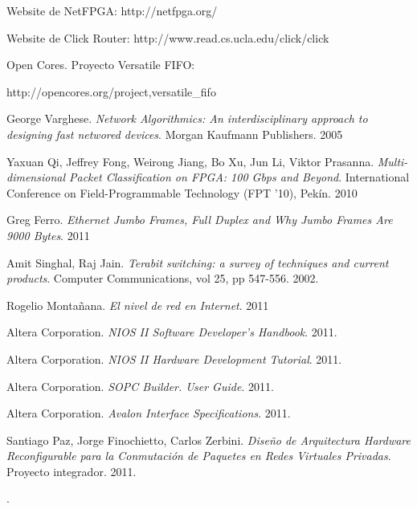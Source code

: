 \begin{thebibliography}{10}

 Website de NetFPGA: http://netfpga.org/

 Website de Click Router: http://www.read.cs.ucla.edu/click/click

 Open Cores. Proyecto Versatile FIFO:

http://opencores.org/project,versatile\_fifo

 George Varghese. \textit{Network Algorithmics: An interdisciplinary approach to designing fast networed devices}. Morgan Kaufmann Publishers. 2005 

Yaxuan Qi, Jeffrey Fong, Weirong Jiang, Bo Xu, Jun Li, Viktor Prasanna. \textit{Multi-dimensional Packet Classification on FPGA: 100 Gbps and Beyond}. International Conference on Field-Programmable Technology (FPT '10), Pekín. 2010

 Greg Ferro. \textit{Ethernet Jumbo Frames, Full Duplex and Why Jumbo Frames Are 9000 Bytes}. 2011

Amit Singhal, Raj Jain. \textit{Terabit switching: a survey of techniques and current products}. Computer Communications, vol 25, pp 547-556. 2002.


 Rogelio Montañana. \textit{El nivel de red en Internet}. 2011

 Altera Corporation. \textit{NIOS II Software Developer's Handbook}. 2011.

 Altera Corporation. \textit{NIOS II Hardware Development Tutorial}. 2011.

 Altera Corporation. \textit{SOPC Builder. User Guide}. 2011.

 Altera Corporation. \textit{Avalon Interface Specifications}. 2011.

 Santiago Paz, Jorge Finochietto, Carlos Zerbini. \textit{Diseño de Arquitectura Hardware Reconfigurable para la Conmutación de Paquetes en Redes Virtuales Privadas}. Proyecto integrador. 2011.



\end{thebibliography}.
